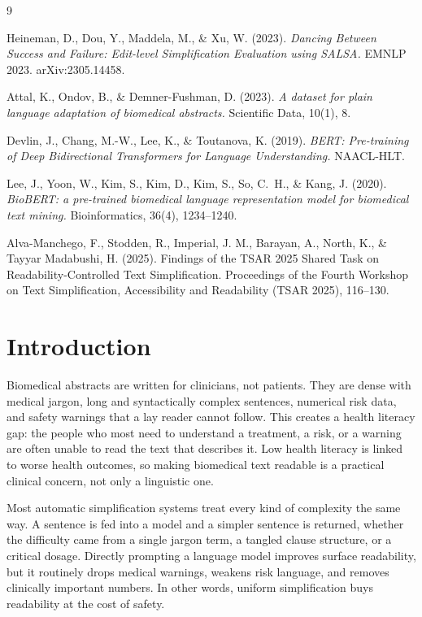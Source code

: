 \documentclass[11pt]{article}
\begin{document}
\begin{thebibliography}{9}

Heineman, D., Dou, Y., Maddela, M., \& Xu, W. (2023).
\emph{Dancing Between Success and Failure: Edit-level Simplification Evaluation
using SALSA.} EMNLP 2023. arXiv:2305.14458.

Attal, K., Ondov, B., \& Demner-Fushman, D. (2023).
\emph{A dataset for plain language adaptation of biomedical abstracts.}
Scientific Data, 10(1), 8.

Devlin, J., Chang, M.-W., Lee, K., \& Toutanova, K. (2019).
\emph{BERT: Pre-training of Deep Bidirectional Transformers for Language
Understanding.} NAACL-HLT.

Lee, J., Yoon, W., Kim, S., Kim, D., Kim, S., So, C.~H., \& Kang, J. (2020).
\emph{BioBERT: a pre-trained biomedical language representation model for
biomedical text mining.} Bioinformatics, 36(4), 1234--1240.

Alva-Manchego, F., Stodden, R., Imperial, J. M., Barayan, A., North, K.,
\& Tayyar Madabushi, H. (2025). Findings of the TSAR 2025 Shared Task on
Readability-Controlled Text Simplification. Proceedings of the Fourth
Workshop on Text Simplification, Accessibility and Readability (TSAR 2025),
116--130.

\section{Introduction}

Biomedical abstracts are written for clinicians, not patients. They are dense
with medical jargon, long and syntactically complex sentences, numerical risk
data, and safety warnings that a lay reader cannot follow. This creates a
health literacy gap: the people who most need to understand a treatment, a
risk, or a warning are often unable to read the text that describes it. Low
health literacy is linked to worse health outcomes, so making biomedical text
readable is a practical clinical concern, not only a linguistic one.

Most automatic simplification systems treat every kind of complexity the same
way. A sentence is fed into a model and a simpler sentence is returned, whether
the difficulty came from a single jargon term, a tangled clause structure, or a
critical dosage. Directly prompting a language model improves surface
readability, but it routinely drops medical warnings, weakens risk language, and
removes clinically important numbers. In other words, uniform simplification
buys readability at the cost of safety.


\end{thebibliography}
\end{document}
